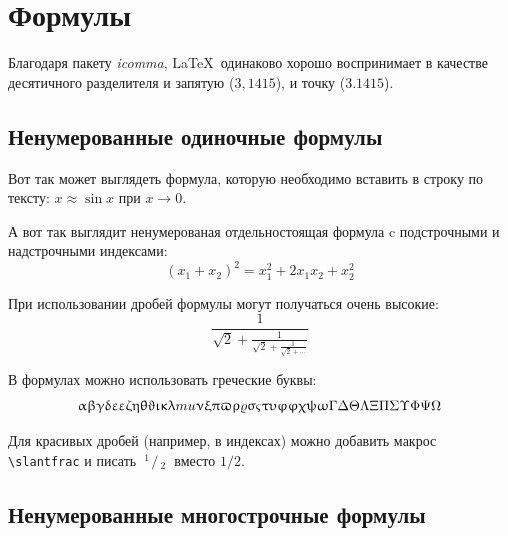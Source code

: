 
\section{Формулы} \label{sect1_3}

Благодаря пакету \textit{icomma}, \LaTeX~одинаково хорошо воспринимает в качестве десятичного разделителя и запятую ($3,1415$), и точку ($3.1415$).

\subsection{Ненумерованные одиночные формулы} \label{subsect1_3_1}

Вот так может выглядеть формула, которую необходимо вставить в строку по тексту: $x \approx \sin x$ при $x \to 0$.

А вот так выглядит ненумерованая отдельностоящая формула c подстрочными и надстрочными индексами:
\[
(x_1+x_2)^2 = x_1^2 + 2 x_1 x_2 + x_2^2
\]

При использовании дробей формулы могут получаться очень высокие:
\[
  \frac{1}{\sqrt{2}+
  \displaystyle\frac{1}{\sqrt{2}+
  \displaystyle\frac{1}{\sqrt{2}+\cdots}}}
\]

В формулах можно использовать греческие буквы:
\[
\alpha\beta\gamma\delta\epsilon\varepsilon\zeta\eta\theta\vartheta\iota\kappa\lambda\\mu\nu\xi\pi\varpi\rho\varrho\sigma\varsigma\tau\upsilon\phi\varphi\chi\psi\omega\Gamma\Delta\Theta\Lambda\Xi\Pi\Sigma\Upsilon\Phi\Psi\Omega
\]

\def\slantfrac#1#2{ \hspace{3pt}\!^{#1}\!\!\hspace{1pt}/
  \hspace{2pt}\!\!_{#2}\!\hspace{3pt}
} %
Для красивых дробей (например, в индексах) можно добавить макрос
\verb+\slantfrac+ и писать $\slantfrac{1}{2}$ вместо $1/2$.

\subsection{Ненумерованные многострочные формулы} \label{subsect1_3_2}

